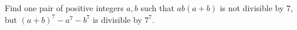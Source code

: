 Find one pair of positive integers $a,b$ such that $ab(a+b)$ is not divisible by $7$,  but $(a+b)^7-a^7-b^7$ is divisible by $7^7$.